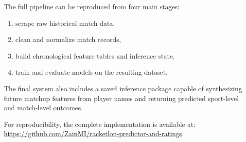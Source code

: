 \documentclass[10pt,twocolumn]{article}
\begin{document}
The full pipeline can be reproduced from four main stages:
\begin{enumerate}[leftmargin=1.2em,itemsep=0.25em]
    \item scrape raw historical match data,
    \item clean and normalize match records,
    \item build chronological feature tables and inference state,
    \item train and evaluate models on the resulting dataset.
\end{enumerate}

The final system also includes a saved inference package capable of synthesizing future matchup features from player names and returning predicted sport-level and match-level outcomes.

For reproducibility, the complete implementation is available at:
\url{https://github.com/ZainMI/racketlon-predictor-and-ratings}.
\end{document}
